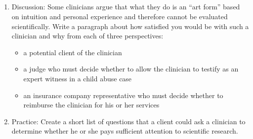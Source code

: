 \subsection{}
\begin{fullwidth}
\begin{enumerate}
\item Discussion: Some clinicians argue that what they do is an “art form” based on intuition and personal experience and therefore cannot be evaluated scientifically. Write a paragraph about how satisfied you would be with such a clinician and why from each of three perspectives:
\begin{itemize}
\item a potential client of the clinician
\item a judge who must decide whether to allow the clinician to testify as an expert witness in a child abuse case
\item an insurance company representative who must decide whether to reimburse the clinician for his or her services
\end{itemize}
\item Practice: Create a short list of questions that a client could ask a clinician to determine whether he or she pays sufficient attention to scientific research.
\end{enumerate}
\end{fullwidth}
